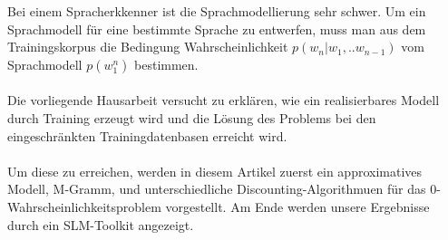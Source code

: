 Bei einem Spracherkkenner ist die Sprachmodellierung sehr schwer. Um ein Sprachmodell f\"ur eine bestimmte Sprache zu entwerfen, muss man aus dem Trainingskorpus die Bedingung Wahrscheinlichkeit $p(w_{n}|w_{1},..w_{n-1})$   vom Sprachmodell $p(w_{1}^n)$   bestimmen.
\\
\\
Die vorliegende Hausarbeit versucht zu erkl\"aren, wie ein realisierbares Modell durch Training erzeugt wird und die L\"osung des Problems bei den eingeschr\"ankten Trainingdatenbasen erreicht wird. 
\\
\\
Um diese zu erreichen, werden in diesem Artikel zuerst ein approximatives Modell, M-Gramm, und unterschiedliche Discounting-Algorithmuen f\"ur das 0-Wahrscheinlichkeitsproblem vorgestellt. Am Ende werden unsere Ergebnisse durch ein SLM-Toolkit angezeigt.
